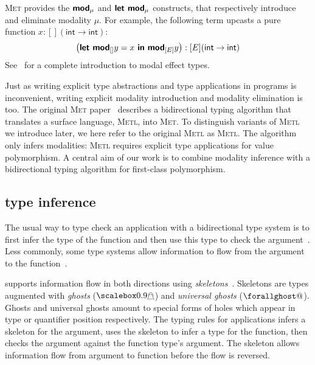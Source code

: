 \documentclass[sigplan, nonacm, natbib = false, review, screen]{acmart}
\makeatletter
\newcommand*\forallghostraise{.16ex} %
\newcommand*\forallscale{0.4}       %
\newcommand{\forallghost}{\mathord{\mathpalette\forallghost@{}}}
\newcommand{\forallghost@}[2]{%
  \ooalign{%
    \hfil$\m@th#1\mathpalette\raiseghost\relax$\hfil\cr
    \hfil\raise\forallghostraise\hbox{%
      \scalebox{\forallscale}{$\m@th#1\forall$}}%
    \hfil\cr
  }%
}
\newcommand{\myghost}{\mathpalette\raiseghost\relax}
\newcommand{\raiseghost}[2]{\raisebox{.5\depth}{\scalebox{0.9}{$#1\mathghost$}}}
\newcommand{\Hole}{{\myghost}}
\newcommand{\TopHole}{\forallghost} %
\newcommand{\keyw}[1]{{\textbf{{\textsf{#1}}}}}
\newcommand{\Met}{\textsc{Met}\xspace}
\newcommand{\Metl}{\textsc{Metl}\xspace}
\newcommand{\Frost}{\text{Frost}\xspace}
\newcommand{\MetlF}{\text{F-}\textsc{Metl}\xspace}
\newcommand{\todobox}[3]{{\todo[color=#1!20,bordercolor=#1!80]{%
  \begin{spacing}{0.9}\footnotesize\textbf{#2:} #3\end{spacing}}}}
\newcommand{\sam}[1]{\todobox{yellow}{Sam}{#1}}
\makeatother
\begin{document}
\Met provides the $\keyw{mod}_\mu$ and $\keyw{let mod}_\mu$ constructs, that
respectively introduce and eliminate modality $\mu$. For example, the following
term upcasts a pure function $x:[](\textsf{int} \to\textsf{int})$:
\[
\left(\keyw{let mod}_{[]} y = x \keyw{ in } \keyw{mod}_{[E]} y\right) : [E](\textsf{int} \to\textsf{int})
\]
%
%
%
See~\cite{tang2025modal, tang2026modal} for a complete introduction to modal
effect types.

Just as writing explicit type abstractions and type applications in programs is
inconvenient, writing explicit modality introduction and modality elimination is
too.
%
The original \Met paper~\cite{tang2025modal} describes a bidirectional typing
algorithm that translates a surface language, \Metl, into \Met. To distinguish
variants of \Metl we introduce later, we here refer to the original \Metl as
\MetlF. The algorithm only infers modalities: \MetlF requires explicit type
applications for value polymorphism.
%
A central aim of our work is to combine modality inference with a bidirectional
typing algorithm for first-class polymorphism.


\subsection{\Frost type inference}
The usual way to type check an application with a bidirectional type system is
to first infer the type of the function and then use this type to check the
argument~\cite{dunfield2013complete, greedy2023, jiang2025bidirectional}. Less
commonly, some type systems allow information to flow from the argument to the
function~\cite{pierce2000local, xie2018let}.

\Frost supports information flow in both directions using
\emph{skeletons}~\cite{tang2025ML}. Skeletons are types augmented with
\emph{ghosts} ($\Hole$) and \emph{universal ghosts} ($\TopHole$). Ghosts and
universal ghosts amount to special forms of holes which appear in type or
quantifier position respectively. The typing rules for applications infers a
skeleton for the argument, uses the skeleton to infer a type for the function,
then checks the argument against the function type's argument. The skeleton
allows information flow from argument to function before the flow is reversed.
\end{document}
